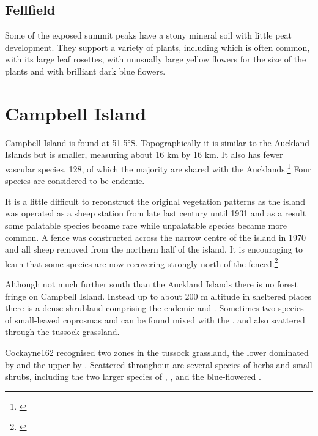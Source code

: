 \subsection{Fellfield}

Some of the exposed summit peaks have a stony mineral soil with little peat development.
They support a variety of plants, including  which is often common,  with its large leaf rosettes,  with unusually large yellow flowers for the size of the plants and  with brilliant dark blue flowers.

\section{Campbell Island}

Campbell Island is found at 51.5°S.
Topographically it is similar to the Auckland Islands but is smaller, measuring about 16 km by 16 km.
It also has fewer vascular species, 128, of which the majority are shared with the Aucklands.\footnote{\cite{oliver1951botanical}}
Four species are considered to be endemic.

It is a little difficult to reconstruct the original vegetation patterns as the island was operated as a sheep station from late last century until 1931 and as a result some palatable species became rare while unpalatable species became more common.
A fence was constructed across the narrow centre of the island in 1970 and all sheep removed from the northern half of the island.
It is encouraging to learn that some species are now recovering strongly north of the fenced.\footnote{\cite{meurk1982regeneration}}

Although not much further south than the Auckland Islands there is no forest fringe on Campbell Island.
Instead up to about 200 m altitude in sheltered places there is a dense shrubland comprising the endemic  and .
Sometimes two species of small-leaved coprosmas and  can be found mixed with the . and also scattered through the tussock grassland.

Cockayne162 recognised two zones in the tussock grassland, the lower dominated by  and the upper by .
Scattered throughout are several species of herbs and small shrubs, including the two larger species of , ,  and the blue-flowered .

